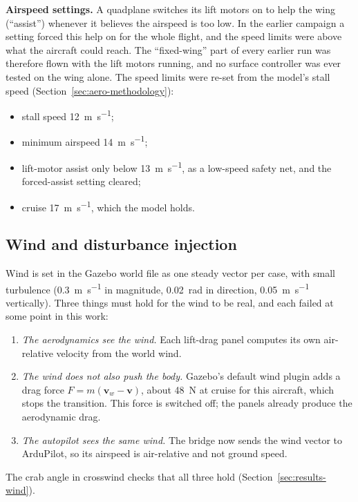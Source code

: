 \documentclass{article}
\begin{document}
\textbf{Airspeed settings.} A quadplane switches its lift motors on to help the wing (``assist'') whenever it believes the airspeed is too low. In the earlier campaign a setting forced this help on for the whole flight, and the speed limits were above what the aircraft could reach. The ``fixed-wing'' part of every earlier run was therefore flown with the lift motors running, and no surface controller was ever tested on the wing alone. The speed limits were re-set from the model's stall speed (Section~\ref{sec:aero-methodology}):
\begin{itemize}
    \item stall speed \SI{12}{\meter\per\second};
    \item minimum airspeed \SI{14}{\meter\per\second};
    \item lift-motor assist only below \SI{13}{\meter\per\second}, as a low-speed safety net, and the forced-assist setting cleared;
    \item cruise \SI{17}{\meter\per\second}, which the model holds.
\end{itemize}

\subsection{Wind and disturbance injection}
\label{sec:wind-injection}
Wind is set in the Gazebo world file as one steady vector per case, with small turbulence (\SI{0.3}{\meter\per\second} in magnitude, \SI{0.02}{\radian} in direction, \SI{0.05}{\meter\per\second} vertically). Three things must hold for the wind to be real, and each failed at some point in this work:
\begin{enumerate}
    \item \emph{The aerodynamics see the wind.} Each lift-drag panel computes its own air-relative velocity from the world wind.
    \item \emph{The wind does not also push the body.} Gazebo's default wind plugin adds a drag force $F=m(\mathbf{v}_w-\mathbf{v})$, about \SI{48}{\newton} at cruise for this aircraft, which stops the transition. This force is switched off; the panels already produce the aerodynamic drag.
    \item \emph{The autopilot sees the same wind.} The bridge now sends the wind vector to ArduPilot, so its airspeed is air-relative and not ground speed.
\end{enumerate}
The crab angle in crosswind checks that all three hold (Section~\ref{sec:results-wind}).
\end{document}
